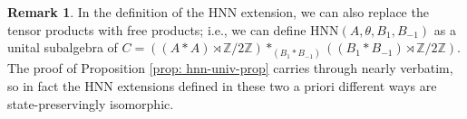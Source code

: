 \documentclass{amsart}
\newtheorem{theorem}{Theorem}[section]
\theoremstyle{definition}
\newtheorem{remark}[theorem]{Remark}
\newcommand{\Z}{\mathbb{Z}}
\begin{document}
\begin{remark}
    In the definition of the HNN extension, we can also replace the tensor products with free products; i.e., we can define $\mathrm{HNN}(A, \theta, B_1, B_{-1})$ as a unital subalgebra of $C = ((A \ast A) \rtimes \Z/2\Z) \ast_{(B_1 \ast B_{-1})} ((B_1 \ast B_{-1}) \rtimes \Z/2\Z)$. The proof of Proposition \ref{prop: hnn-univ-prop} carries through nearly verbatim, so in fact the HNN extensions defined in these two a priori different ways are state-preservingly isomorphic.
\end{remark}

\end{document}

